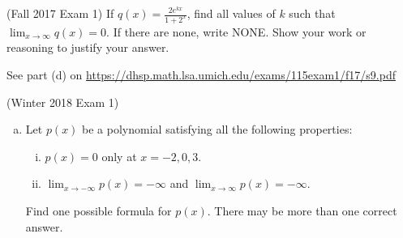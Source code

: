 \documentclass[11pt]{exam}
\newcommand{\plainanswer}[1]{\ifprintanswers #1 \fi}
\begin{document}
\begin{questions}
\question (Fall 2017 Exam 1)
If $q(x) = \frac{2e^{kx}}{1+2^x}$, find all values of $k$ such that $\displaystyle\lim_{x \rightarrow \infty}q(x) = 0$. If there are none, write NONE. Show your work or reasoning to justify your answer.
\begin{solution}
  See part (d) on \href{https://dhsp.math.lsa.umich.edu/exams/115exam1/f17/s9.pdf}{https://dhsp.math.lsa.umich.edu/exams/115exam1/f17/s9.pdf}
\end{solution}
\vspace{0.5in}
\question (Winter 2018 Exam 1) \begin{enumerate}[(a)]
\item Let $p(x)$ be a polynomial satisfying all the following properties: 
\begin{enumerate}[(i)]
\item $p(x) = 0$ only at $x = -2, 0, 3$.
\item $\displaystyle\lim_{x \rightarrow - \infty} p(x) = - \infty$ and $\displaystyle\lim_{x \rightarrow \infty} p(x) = - \infty$.
\end{enumerate}
Find one possible formula for $p(x)$. There may be more than one correct answer.


\end{enumerate}
\end{questions}
\end{document}

